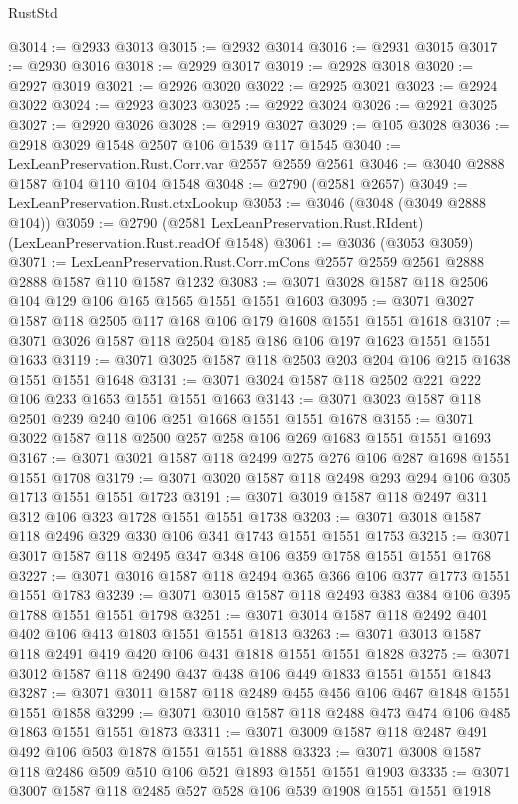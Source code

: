 \begin{lexlean}{RustStd}
\begin{coremodule}
@3014 := @2933 @3013
@3015 := @2932 @3014
@3016 := @2931 @3015
@3017 := @2930 @3016
@3018 := @2929 @3017
@3019 := @2928 @3018
@3020 := @2927 @3019
@3021 := @2926 @3020
@3022 := @2925 @3021
@3023 := @2924 @3022
@3024 := @2923 @3023
@3025 := @2922 @3024
@3026 := @2921 @3025
@3027 := @2920 @3026
@3028 := @2919 @3027
@3029 := @105 @3028
@3036 := @2918 @3029 @1548 @2507 @106 @1539 @117 @1545
@3040 := LexLeanPreservation.Rust.Corr.var @2557 @2559 @2561
@3046 := @3040 @2888 @1587 @104 @110 @104 @1548
@3048 := @2790 (@2581 @2657)
@3049 := LexLeanPreservation.Rust.ctxLookup
@3053 := @3046 (@3048 (@3049 @2888 @104))
@3059 := @2790 (@2581 LexLeanPreservation.Rust.RIdent) (LexLeanPreservation.Rust.readOf @1548)
@3061 := @3036 (@3053 @3059)
@3071 := LexLeanPreservation.Rust.Corr.mCons @2557 @2559 @2561 @2888 @2888 @1587 @110 @1587 @1232
@3083 := @3071 @3028 @1587 @118 @2506 @104 @129 @106 @165 @1565 @1551 @1551 @1603
@3095 := @3071 @3027 @1587 @118 @2505 @117 @168 @106 @179 @1608 @1551 @1551 @1618
@3107 := @3071 @3026 @1587 @118 @2504 @185 @186 @106 @197 @1623 @1551 @1551 @1633
@3119 := @3071 @3025 @1587 @118 @2503 @203 @204 @106 @215 @1638 @1551 @1551 @1648
@3131 := @3071 @3024 @1587 @118 @2502 @221 @222 @106 @233 @1653 @1551 @1551 @1663
@3143 := @3071 @3023 @1587 @118 @2501 @239 @240 @106 @251 @1668 @1551 @1551 @1678
@3155 := @3071 @3022 @1587 @118 @2500 @257 @258 @106 @269 @1683 @1551 @1551 @1693
@3167 := @3071 @3021 @1587 @118 @2499 @275 @276 @106 @287 @1698 @1551 @1551 @1708
@3179 := @3071 @3020 @1587 @118 @2498 @293 @294 @106 @305 @1713 @1551 @1551 @1723
@3191 := @3071 @3019 @1587 @118 @2497 @311 @312 @106 @323 @1728 @1551 @1551 @1738
@3203 := @3071 @3018 @1587 @118 @2496 @329 @330 @106 @341 @1743 @1551 @1551 @1753
@3215 := @3071 @3017 @1587 @118 @2495 @347 @348 @106 @359 @1758 @1551 @1551 @1768
@3227 := @3071 @3016 @1587 @118 @2494 @365 @366 @106 @377 @1773 @1551 @1551 @1783
@3239 := @3071 @3015 @1587 @118 @2493 @383 @384 @106 @395 @1788 @1551 @1551 @1798
@3251 := @3071 @3014 @1587 @118 @2492 @401 @402 @106 @413 @1803 @1551 @1551 @1813
@3263 := @3071 @3013 @1587 @118 @2491 @419 @420 @106 @431 @1818 @1551 @1551 @1828
@3275 := @3071 @3012 @1587 @118 @2490 @437 @438 @106 @449 @1833 @1551 @1551 @1843
@3287 := @3071 @3011 @1587 @118 @2489 @455 @456 @106 @467 @1848 @1551 @1551 @1858
@3299 := @3071 @3010 @1587 @118 @2488 @473 @474 @106 @485 @1863 @1551 @1551 @1873
@3311 := @3071 @3009 @1587 @118 @2487 @491 @492 @106 @503 @1878 @1551 @1551 @1888
@3323 := @3071 @3008 @1587 @118 @2486 @509 @510 @106 @521 @1893 @1551 @1551 @1903
@3335 := @3071 @3007 @1587 @118 @2485 @527 @528 @106 @539 @1908 @1551 @1551 @1918

\end{coremodule}
\end{lexlean}
